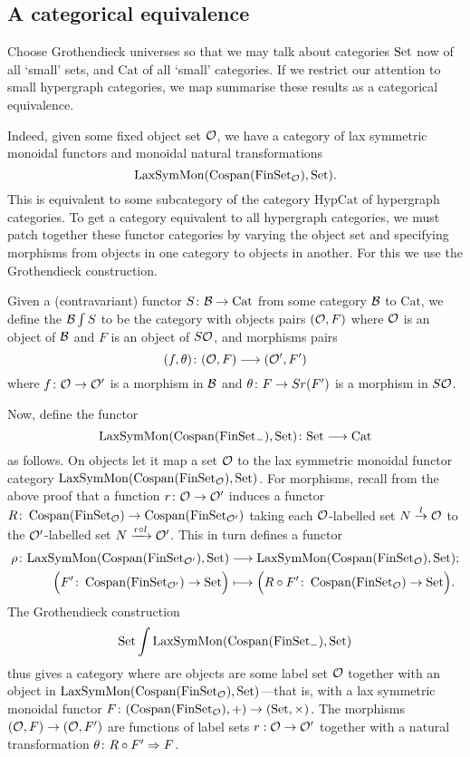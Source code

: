 \subsection{A categorical equivalence}

Choose Grothendieck universes so that we may talk about categories $\mathrm{Set}$ now of
all `small' sets, and $\mathrm{Cat}$ of all `small' categories. If we restrict
our attention to small hypergraph categories, we map summarise these results as a categorical equivalence. 

Indeed, given some fixed object set $\mathcal O$, we have a category of lax symmetric
monoidal functors and monoidal natural transformations
\[
  \mathrm{LaxSymMon}(\operatorname{{Cospan}}(\mathrm{FinSet}_{\mathcal O}),\mathrm{Set}).
\]
This is equivalent to some subcategory of the category $\mathrm{HypCat}$ of
hypergraph categories. To get a category equivalent to all hypergraph
categories, we must patch together these functor categories by varying the
object set and specifying morphisms from objects in one category to objects in
another. For this we use the Grothendieck construction. 

Given a (contravariant) functor $S{\colon} \mathcal B \to \mathrm{Cat}$ from some
category $\mathcal B$ to $\mathrm{Cat}$, we define the  $\mathcal B \int S$ to be the category with objects pairs
$(\mathcal O,F)$ where $\mathcal O$ is an object of $\mathcal B$ and $F$ is an object of $S\mathcal
O$, and morphisms pairs 
\[
  (f,\theta){\colon} (\mathcal O,F) \longrightarrow (\mathcal O',F')
\]
where $f{\colon} \mathcal O \to \mathcal O'$ is a morphism in $\mathcal B$ and $\theta{\colon} F \to
Sr(F')$ is a morphism in $S\mathcal O$.

Now, define the functor 
\[
  \mathrm{LaxSymMon}(\operatorname{{Cospan}}(\mathrm{FinSet}_{-}), \mathrm{Set}){\colon} \mathrm{Set} \longrightarrow
  \mathrm{Cat}
\]
as follows. On objects let it map a set $\mathcal O$ to the lax symmetric monoidal
functor category $\mathrm{LaxSymMon}(\operatorname{{Cospan}}(\mathrm{FinSet}_{\mathcal O}), \mathrm{Set})$. For
morphisms, recall from the above proof that a function $r{\colon} \mathcal O \to \mathcal O'$
induces a functor $R{\colon} \operatorname{{Cospan}}(\mathrm{FinSet}_{\mathcal O}) \to \operatorname{{Cospan}}(\mathrm{FinSet}_{\mathcal
O'})$ taking each $\mathcal O$-labelled set $N \stackrel{l}\to \mathcal O$ to the $\mathcal
O'$-labelled set $N \xrightarrow{r \circ l} \mathcal O'$. This in turn defines a
functor 
\begin{align*}
  \rho{\colon} \mathrm{LaxSymMon}(\operatorname{{Cospan}}(\mathrm{FinSet}_{\mathcal O'}), \mathrm{Set}) &\longrightarrow
\mathrm{LaxSymMon}(\operatorname{{Cospan}}(\mathrm{FinSet}_{\mathcal O}), \mathrm{Set}); \\
\Big(F'{\colon}
\operatorname{{Cospan}}(\mathrm{FinSet}_{\mathcal O'}) \to \mathrm{Set}\Big) &\longmapsto \Big(R\circ F'{\colon}  \operatorname{{Cospan}}(\mathrm{FinSet}_{\mathcal O})
\to \mathrm{Set}\Big).
\end{align*}
The Grothendieck construction 
\[
 \mathrm{Set}\int \mathrm{LaxSymMon}(\operatorname{{Cospan}}(\mathrm{FinSet}_{-}), \mathrm{Set})
\]
thus gives a category where are objects are some label set $\mathcal O$ together with
an object in $\mathrm{LaxSymMon}(\operatorname{{Cospan}}(\mathrm{FinSet}_{\mathcal O}), \mathrm{Set})$---that is,
with a lax symmetric monoidal functor $F{\colon} (\operatorname{{Cospan}}(\mathrm{FinSet}_{\mathcal O}),+) \to
(\mathrm{Set},\times)$. The morphisms $(\mathcal O, F) \to (\mathcal O,F')$ are functions of label
sets $r: \mathcal O \to \mathcal O'$ together with a natural transformation $\theta{\colon}
R \circ F'\Rightarrow F$.

